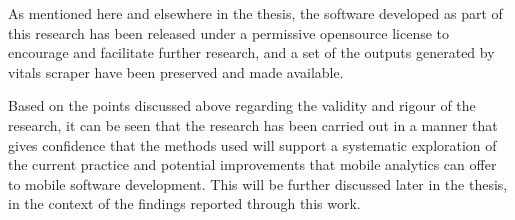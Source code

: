 As mentioned here and elsewhere in the thesis, the software developed as part of this research has been released under a permissive opensource license to encourage and facilitate further research, and a set of the outputs generated by vitals scraper have been preserved and made available.

Based on the points discussed above regarding the validity and rigour of the research, it can be seen that the research has been carried out in a manner that gives confidence that the methods used will support a systematic exploration of the current practice and potential improvements that mobile analytics can offer to mobile software development. This will be further discussed later in the thesis, in the context of the findings reported through this work.





